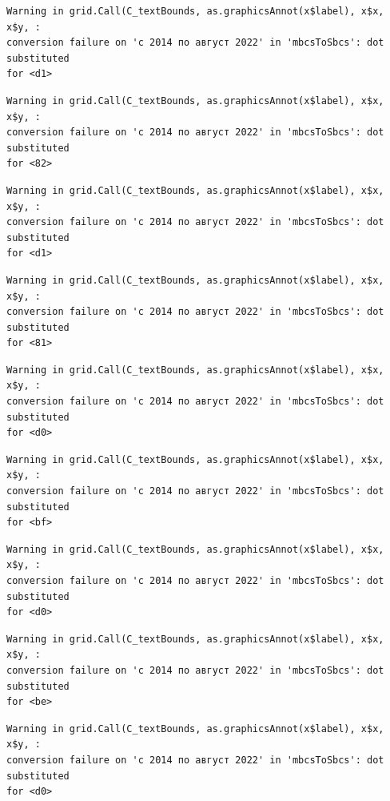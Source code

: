 \documentclass[
  letterpaper,
  DIV=11,
  numbers=noendperiod]{scrartcl}
\begin{document}
\begin{verbatim}
Warning in grid.Call(C_textBounds, as.graphicsAnnot(x$label), x$x, x$y, :
conversion failure on 'с 2014 по август 2022' in 'mbcsToSbcs': dot substituted
for <d1>
\end{verbatim}

\begin{verbatim}
Warning in grid.Call(C_textBounds, as.graphicsAnnot(x$label), x$x, x$y, :
conversion failure on 'с 2014 по август 2022' in 'mbcsToSbcs': dot substituted
for <82>
\end{verbatim}

\begin{verbatim}
Warning in grid.Call(C_textBounds, as.graphicsAnnot(x$label), x$x, x$y, :
conversion failure on 'с 2014 по август 2022' in 'mbcsToSbcs': dot substituted
for <d1>
\end{verbatim}

\begin{verbatim}
Warning in grid.Call(C_textBounds, as.graphicsAnnot(x$label), x$x, x$y, :
conversion failure on 'с 2014 по август 2022' in 'mbcsToSbcs': dot substituted
for <81>
\end{verbatim}

\begin{verbatim}
Warning in grid.Call(C_textBounds, as.graphicsAnnot(x$label), x$x, x$y, :
conversion failure on 'с 2014 по август 2022' in 'mbcsToSbcs': dot substituted
for <d0>
\end{verbatim}

\begin{verbatim}
Warning in grid.Call(C_textBounds, as.graphicsAnnot(x$label), x$x, x$y, :
conversion failure on 'с 2014 по август 2022' in 'mbcsToSbcs': dot substituted
for <bf>
\end{verbatim}

\begin{verbatim}
Warning in grid.Call(C_textBounds, as.graphicsAnnot(x$label), x$x, x$y, :
conversion failure on 'с 2014 по август 2022' in 'mbcsToSbcs': dot substituted
for <d0>
\end{verbatim}

\begin{verbatim}
Warning in grid.Call(C_textBounds, as.graphicsAnnot(x$label), x$x, x$y, :
conversion failure on 'с 2014 по август 2022' in 'mbcsToSbcs': dot substituted
for <be>
\end{verbatim}

\begin{verbatim}
Warning in grid.Call(C_textBounds, as.graphicsAnnot(x$label), x$x, x$y, :
conversion failure on 'с 2014 по август 2022' in 'mbcsToSbcs': dot substituted
for <d0>
\end{verbatim}
\end{document}
